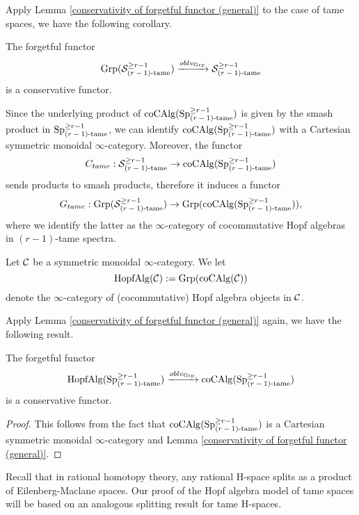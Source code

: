 Apply Lemma \ref{conservativity of forgetful functor (general)} to the case of tame spaces, we have the following corollary.

\begin{corollary}
\label{conservativity of forgetful functor}
	The forgetful functor 
	\[
	\operatorname{Grp}({\mathcal{S}}^{\geq r-1}_{\text{($r-1$)-tame}}) \xrightarrow{oblv_{\operatorname{Grp}}} 
	{\mathcal{S}}^{\geq r-1}_{\text{($r-1$)-tame}}
	\]
	is a conservative functor.
\end{corollary}

Since the underlying product of $\operatorname{coCAlg}(\operatorname{Sp}^{\geq r-1}_{\text{($r-1$)-tame}})$ is given by the smash product in $\operatorname{Sp}^{\geq r-1}_{\text{($r-1$)-tame}}$, we can identify $\operatorname{coCAlg}(\operatorname{Sp}^{\geq r-1}_{\text{($r-1$)-tame}})$ with a Cartesian symmetric monoidal $\infty$-category. Moreover, the functor 
$$C_{tame}: {\mathcal{S}}^{\geq r-1}_{\text{($r-1$)-tame}} \to
\operatorname{coCAlg}(\operatorname{Sp}^{\geq r-1}_{\text{($r-1$)-tame}})$$
sends products to smash products, therefore it induces a functor
$$
G_{tame}:\operatorname{Grp}({\mathcal{S}}^{\geq r-1}_{\text{($r-1$)-tame}})
\to
\operatorname{Grp}(\operatorname{coCAlg}(\operatorname{Sp}^{\geq r-1}_{\text{($r-1$)-tame}})),
$$
where we identify the latter as the $\infty$-category of cocommutative Hopf algebras in $(r-1)$-tame spectra.

\begin{definition}
	Let ${\mathcal{C}}$ be a symmetric monoidal $\infty$-category. We let 
	$$
	\operatorname{HopfAlg}({\mathcal{C}}):=\operatorname{Grp}(\operatorname{coCAlg}({\mathcal{C}}))
	$$
	denote the $\infty$-category of (cocommutative) Hopf algebra objects in ${\mathcal{C}}$.
\end{definition}


Apply Lemma \ref{conservativity of forgetful functor (general)} again, we have the following result.
\begin{corollary}
\label{conservativity of the forgetful functor for Hopf algebras}
		The forgetful functor 
	\[
	\operatorname{HopfAlg}(\operatorname{Sp}^{\geq r-1}_{\text{($r-1$)-tame}}) \xrightarrow{oblv_{\operatorname{Grp}}} 
	\operatorname{coCAlg}(\operatorname{Sp}^{\geq r-1}_{\text{($r-1$)-tame}})
	\]
	is a conservative functor.
\end{corollary}
\begin{proof}
	This follows from the fact that $\operatorname{coCAlg}(\operatorname{Sp}^{\geq r-1}_{\text{($r-1$)-tame}})$ is a Cartesian symmetric monoidal $\infty$-category and Lemma \ref{conservativity of forgetful functor (general)}.
\end{proof}

Recall that in rational homotopy theory, any rational H-space splits as a product of Eilenberg-Maclane spaces.
Our proof of the Hopf algebra model of tame spaces will be based on an analogous splitting result for tame H-spaces.


